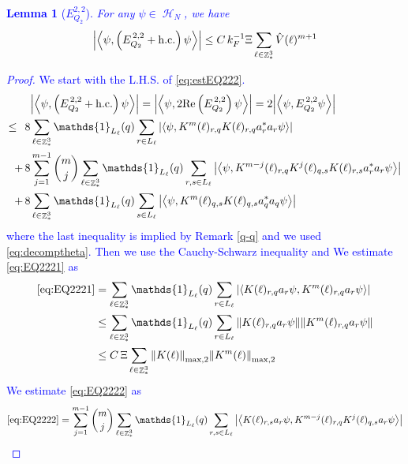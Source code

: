 \documentclass[sn-mathphys, Numbered ,a4paper]{sn-jnl}%
\DeclareMathOperator{\Z}{\mathbb{Z}}
\DeclareMathOperator{\HH}{\mathcal{H}}
\newcommand{\eva}[1]{\left\langle #1 \right\rangle}
\theoremstyle{plain}
\newtheorem{lemma}[theorem]{Lemma}
\theoremstyle{definition}
\theoremstyle{remark}
\theoremstyle{plain}
\theoremstyle{definition}
\theoremstyle{remark}
\begin{document}
\textcolor{blue}{\begin{lemma}[$E_{Q_2}^{2,2}$]
For any $\psi \in \HH_N$, we have
\begin{equation}
    \abs{\eva{\psi,\left(E^{\,2,2}_{Q_2}+\mathrm{h.c.}\right) \psi }}
   \leq   C\, k_{F}^{-1} \Xi \sum\limits_{\ell \in \Z^3_*} \hat{V}(\ell)^{m+1}  \label{eq:estEQ222}
    \end{equation}
\end{lemma}
\begin{proof}
We start with the L.H.S. of \eqref{eq:estEQ222}.
\begin{align}
	&\abs{\eva{\psi,\left(E^{\,2,2}_{Q_2}+\mathrm{h.c.}\right) \psi }} = \abs{\eva{\psi,2\mathrm{Re}\left(E^{\,2,2}_{Q_2}\right) \psi }} = 2\abs{\eva{\psi, E^{\,2,2}_{Q_2} \psi }}\nonumber\\
	\leq\,\;8& \sum\limits_{\ell \in \Z^3_*} \mathds{1}_{L_{\ell}}(q) \sum\limits_{r\in L_{\ell}} \abs{\eva{\psi, K^m(\ell)_{r,q} K(\ell)_{r,q} a^*_{r} a_{r} \psi }}\label{eq:EQ2221}\\
	+\,8& \sum\limits_{j=1}^{m-1} {{m}\choose j} \sum\limits_{\ell \in \Z^3_*}\mathds{1}_{L_{\ell}}(q) \sum\limits_{r,s\in L_{\ell}}  \abs{\eva{\psi,K^{m-j}(\ell)_{r,q} K^{j}(\ell)_{q,s} K(\ell)_{r,s} a^*_{r} a_{r}   \psi }}\label{eq:EQ2222}\\
	+\,8&\sum\limits_{\ell \in \Z^3_*} \mathds{1}_{L_{\ell}}(q) \sum\limits_{ s \in L_{\ell}} \abs{\eva{\psi, K^m(\ell)_{q,s} K(\ell)_{q,s} a^*_{q} a_{q} \psi }}\label{eq:EQ2223}
\end{align}
where the last inequality is implied by Remark \ref{q-q} and we used \eqref{eq:decomptheta}. Then we use the Cauchy-Schwarz inequality and We estimate \eqref{eq:EQ2221} as 
\begin{align}
	\eqref{eq:EQ2221}
	&= \sum\limits_{\ell \in \Z^3_*} \mathds{1}_{L_{\ell}}(q) \sum\limits_{r\in L_{\ell}} \abs{\eva{ K(\ell)_{r,q} a_{r} \psi, K^m(\ell)_{r,q}  a_{r} \psi }}\nonumber\\
	&\leq \sum\limits_{\ell \in \Z^3_*} \mathds{1}_{L_{\ell}}(q) \sum\limits_{r\in L_{\ell}} \norm{ K(\ell)_{r,q} a_{r} \psi}\norm{ K^m(\ell)_{r,q}  a_{r} \psi }\nonumber\\
	&\leq C\,\Xi\sum\limits_{\ell \in \Z^3_*} \norm{K(\ell)}_{\mathrm{max,2}} \norm{K^m(\ell)}_{\mathrm{max,2}} \label{eq:estEQ2221}
\end{align}
We estimate \eqref{eq:EQ2222} as
\begin{align}
	\eqref{eq:EQ2222}
	&=\sum\limits_{j=1}^{m-1} {{m}\choose j} \sum\limits_{\ell \in \Z^3_*}\mathds{1}_{L_{\ell}}(q) \sum\limits_{r,s\in L_{\ell}}  \abs{\eva{ K(\ell)_{r,s} a_{r}\psi, K^{m-j}(\ell)_{r,q} K^{j}(\ell)_{q,s} a_{r} \psi }}\nonumber\\

\end{align}
\end{proof}}
\end{document}

